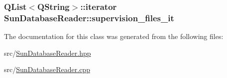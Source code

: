 \hypertarget{class_sun_database_reader_a78e30a0ac9cfa46c23dbdf8d37226b51}{
\subsubsection[{supervision\+\_\+files\+\_\+it}]{\setlength{\rightskip}{0pt plus 5cm}Q\+List$<$Q\+String$>$\+::iterator Sun\+Database\+Reader\+::supervision\+\_\+files\+\_\+it\hspace{0.3cm}{\ttfamily [private]}}}\label{class_sun_database_reader_a78e30a0ac9cfa46c23dbdf8d37226b51}


The documentation for this class was generated from the following files\+:\begin{DoxyCompactItemize}
\item 
src/\hyperlink{_sun_database_reader_8hpp}{Sun\+Database\+Reader.\+hpp}\item 
src/\hyperlink{_sun_database_reader_8cpp}{Sun\+Database\+Reader.\+cpp}\end{DoxyCompactItemize}
